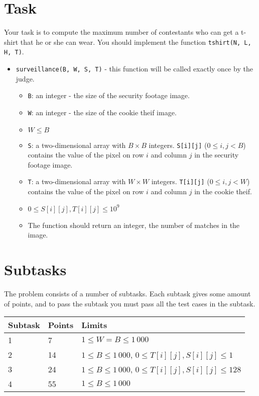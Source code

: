 \section*{Task}
Your task is to compute the maximum number of contestants who can get a t-shirt that he or she can wear.
You should implement the function \texttt{tshirt(N, L, H, T)}.
\begin{itemize}
  \item \texttt{surveillance(B, W, S, T)} - this function will be called exactly once by the judge.
  \begin{itemize}
    \item \texttt{B}: an integer - the size of the security footage image.
    \item \texttt{W}: an integer - the size of the cookie theif image.
    \item $W \le B$
    \item \texttt{S}: a two-dimensional array with $B \times B$ integers. \texttt{S[i][j]} ($0 \le i, j < B$) contains the value of the pixel on row $i$ and column $j$ in the security footage image.
    \item \texttt{T}: a two-dimensional array with $W \times W$ integers. \texttt{T[i][j]} ($0 \le i, j < W$) contains the value of the pixel on row $i$ and column $j$ in the cookie theif.
    \item $0 \le S[i][j], T[i][j] \le 10^9$
    \item The function should return an integer, the number of matches in the image.
  \end{itemize}
\end{itemize}

\section*{Subtasks}
The problem consists of a number of subtasks. Each subtask gives some amount of points, and to pass
the subtask you must pass all the test cases in the subtask.

\begin{tabular}{|l|l|l|}
  \hline
  \textbf{Subtask} & \textbf{Points} & \textbf{Limits} \\ \hline
  1 & 7 & $1 \le W = B \le 1\,000$  \\ \hline

  2 & 14 & $1 \le B \le 1\,000$, $0 \le T[i][j], S[i][j] \le 1$ \\ \hline

  3 & 24 & $1 \le B \le 1\,000$, $0 \le T[i][j], S[i][j] \le 128$ \\ \hline

  4 & 55 & $1 \le B \le 1\,000$ \\ \hline

\end{tabular}

